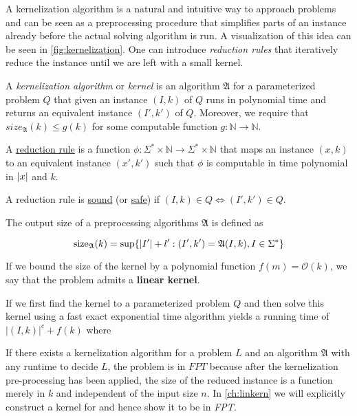 A kernelization algorithm is a natural and intuitive way to approach problems and can be seen as a preprocessing procedure that simplifies parts of an instance already before the actual solving algorithm is run. 
A visualization of this idea can be seen in \cref{fig:kernelization}.
One can introduce \textit{reduction rules} that iteratively reduce the instance until we are left with a small kernel.   

\begin{definition}
A \textit{kernelization algorithm} or \textit{kernel} is an algorithm $\mathfrak{A}$ for a parameterized problem $Q$ that given an instance $(I,k)$ of $Q$ runs in polynomial time and returns an equivalent instance $(I', k')$ of $Q$. Moreover, we require that $size_{\mathfrak{A}}(k) \leq g(k)$ for some computable function $g:\mathbb{N} \rightarrow \mathbb{N}$.

A \underline{reduction rule} is a function $\phi:\Sigma^* \times \mathbb{N} \rightarrow \Sigma^* \times \mathbb{N}$ that maps an instance $(x,k)$ to an equivalent instance $(x',k')$ such that $\phi$ is computable in time polynomial in $\abs{x}$ and $k$.

A reduction rule is \underline{sound} (or \underline{safe}) if $(I, k) \in Q \Leftrightarrow (I',k') \in Q$.
\end{definition}

\begin{definition} The output size of a preprocessing algorithms $\mathfrak{A}$ is defined as 

    \[\mathrm{size}_{\mathfrak{A}}(k) = \sup\{\abs{I'} + l': (I',k')= \mathfrak{A}(I,k), I \in \Sigma^* \} \]
\end{definition}

If we bound the size of the kernel by a polynomial function $f(m) = \mathcal{O}(k)$, we say that the problem admits a \textbf{linear kernel}.  

If we first find the kernel to a parameterized problem $Q$ and then solve this kernel using a fast exact exponential time algorithm yields a running time of $|(I,k)|^c + f(k)$ where 

If there exists a kernelization algorithm for a problem $L$ and an algorithm $\mathfrak{A}$ with any runtime to decide $L$, the problem is in $FPT$ because after the kernelization pre-processing has been applied, the size of the reduced instance is a function merely in $k$ and independent of the input size $n$. In \cref{ch:linkern} we will explicitly construct a kernel for \psdom and hence show it to be in \textit{FPT}. 

